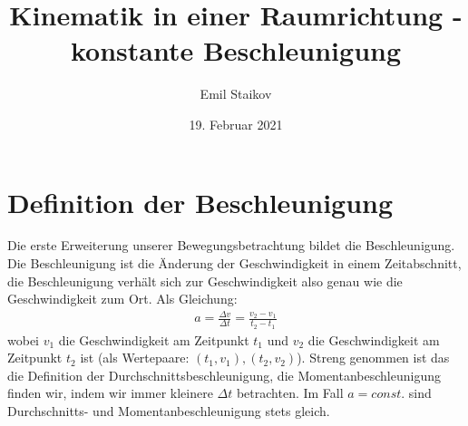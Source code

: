 \documentclass[11pt]{article}
\title{Kinematik in einer Raumrichtung - konstante Beschleunigung}
\author{Emil Staikov}
\date{19. Februar 2021}
\begin{document}
\maketitle
\section{Definition der Beschleunigung}
Die erste Erweiterung unserer Bewegungsbetrachtung bildet die Beschleunigung. Die Beschleunigung ist die Änderung der Geschwindigkeit in einem Zeitabschnitt, die Beschleunigung verhält sich zur Geschwindigkeit also genau wie die Geschwindigkeit zum Ort. Als Gleichung:
\begin{gather}
    a = \frac{\Delta v}{\Delta t} = \frac{v_2 - v_1}{t_2 - t_1}
\end{gather}
wobei $v_1$ die Geschwindigkeit am Zeitpunkt $t_1$ und $v_2$ die Geschwindigkeit am Zeitpunkt $t_2$ ist (als Wertepaare: $(t_1, v_1), (t_2, v_2)$). Streng genommen ist das die Definition der Durchschnittsbeschleunigung, die Momentanbeschleunigung finden wir, indem wir immer kleinere $\Delta t$ betrachten. Im Fall $a = const.$ sind Durchschnitts- und Momentanbeschleunigung stets gleich. 
\end{document}
